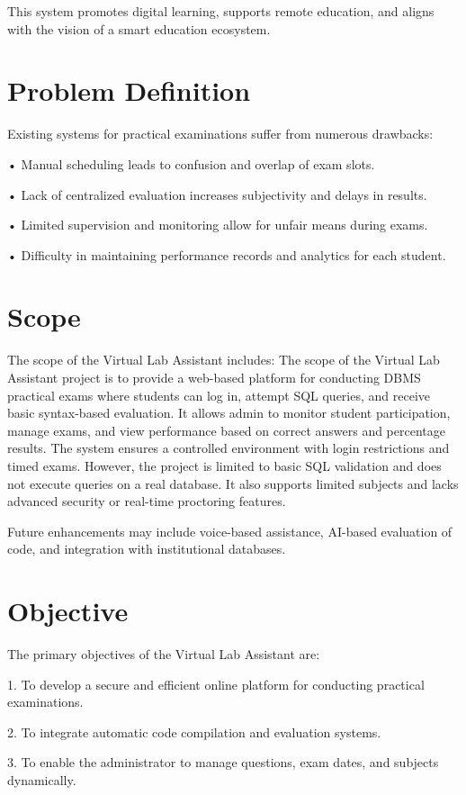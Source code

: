 This system promotes digital learning, supports remote education, and aligns with the vision of a smart education ecosystem.


\section{Problem Definition}
Existing systems for practical examinations suffer from numerous drawbacks:
\item •	Manual scheduling leads to confusion and overlap of exam slots.
\item •	Lack of centralized evaluation increases subjectivity and delays in results.
\item •	Limited supervision and monitoring allow for unfair means during exams.
\item •	Difficulty in maintaining performance records and analytics for each student.



\section{Scope}
The scope of the Virtual Lab Assistant includes:
The scope of the Virtual Lab Assistant project is to provide a web-based platform for conducting DBMS practical exams where students can log in, attempt SQL queries, and receive basic syntax-based evaluation. It allows admin to monitor student participation, manage exams, and view performance based on correct answers and percentage results. The system ensures a controlled environment with login restrictions and timed exams. However, the project is limited to basic SQL validation and does not execute queries on a real database. It also supports limited subjects and lacks advanced security or real-time proctoring features.

Future enhancements may include voice-based assistance, AI-based evaluation of code, and integration with institutional databases.



\section{Objective}
The primary objectives of the Virtual Lab Assistant are:
\item 1.	To develop a secure and efficient online platform for conducting practical examinations.
\item 2.	To integrate automatic code compilation and evaluation systems.
\item 3.	To enable the administrator to manage questions, exam dates, and subjects dynamically.


